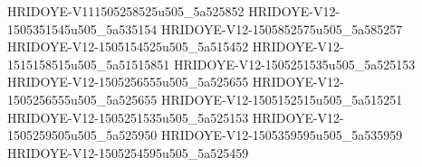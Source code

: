 HRIDOYE-V111505258525u505_5a525852
HRIDOYE-V12-1505351545u505_5a535154
HRIDOYE-V12-1505852575u505_5a585257 
HRIDOYE-V12-1505154525u505_5a515452
HRIDOYE-V12-1515158515u505_5a51515851
HRIDOYE-V12-1505251535u505_5a525153
HRIDOYE-V12-1505256555u505_5a525655
HRIDOYE-V12-1505256555u505_5a525655
HRIDOYE-V12-1505152515u505_5a515251
HRIDOYE-V12-1505251535u505_5a525153
HRIDOYE-V12-1505259505u505_5a525950
HRIDOYE-V12-1505359595u505_5a535959
HRIDOYE-V12-1505254595u505_5a525459
